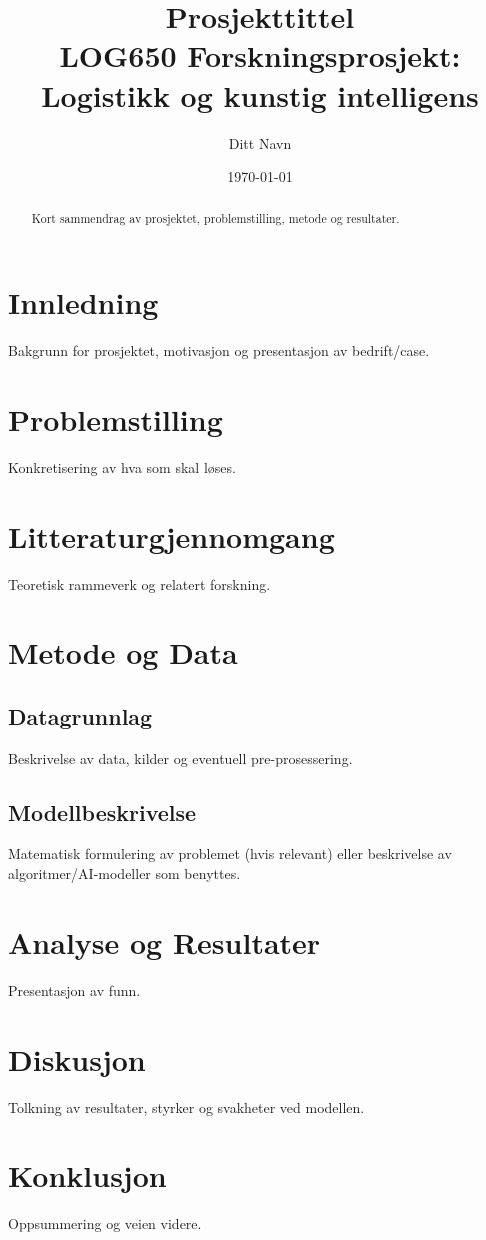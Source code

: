 \documentclass[a4paper,12pt]{article}
\title{Prosjekttittel\\ \large LOG650 Forskningsprosjekt: Logistikk og kunstig intelligens}
\author{Ditt Navn}
\date{\today}
\begin{document}
\maketitle

\begin{abstract}
Kort sammendrag av prosjektet, problemstilling, metode og resultater.
\end{abstract}

\tableofcontents
\newpage

\section{Innledning}
Bakgrunn for prosjektet, motivasjon og presentasjon av bedrift/case.

\section{Problemstilling}
Konkretisering av hva som skal løses.

\section{Litteraturgjennomgang}
Teoretisk rammeverk og relatert forskning.

\section{Metode og Data}
\subsection{Datagrunnlag}
Beskrivelse av data, kilder og eventuell pre-prosessering.

\subsection{Modellbeskrivelse}
Matematisk formulering av problemet (hvis relevant) eller beskrivelse av algoritmer/AI-modeller som benyttes.

\section{Analyse og Resultater}
Presentasjon av funn.

\section{Diskusjon}
Tolkning av resultater, styrker og svakheter ved modellen.

\section{Konklusjon}
Oppsummering og veien videre.


\end{document}
